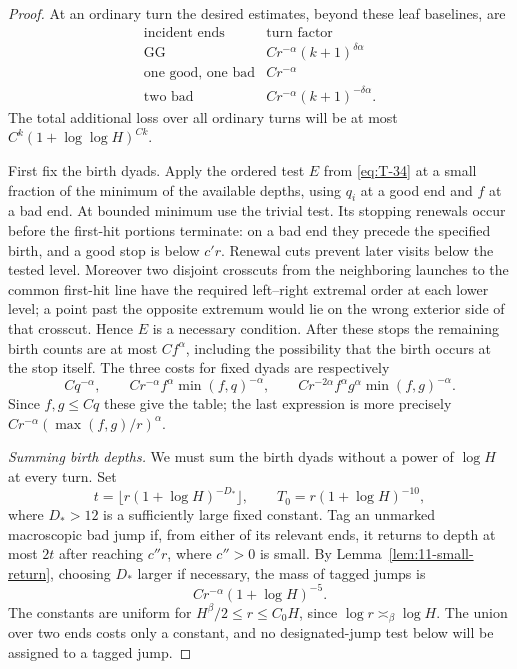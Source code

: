 \begin{proof}
At an ordinary turn the desired estimates, beyond these leaf
baselines, are
\begin{equation}
\begin{array}{c|c}
 \text{incident ends}&\text{turn factor}\\ \hline
 \mathrm{GG}&Cr^{-\alpha}(k+1)^{\delta\alpha}\\
 \text{one good, one bad}&Cr^{-\alpha}\\
 \text{two bad}&Cr^{-\alpha}(k+1)^{-\delta\alpha}.
\end{array}
\label{eq:L-38}
\end{equation}
The total additional loss over all ordinary turns will be at most
$C^k(1+\log\log H)^{Ck}$.

First fix the birth dyads. Apply the ordered test $E$ from
\eqref{eq:T-34} at a small fraction of the minimum of the available
depths, using $q_i$ at a good end and $f$ at a bad end. At bounded
minimum use the trivial test. Its stopping renewals occur before the
first-hit portions terminate: on a bad end they precede the specified
birth, and a good stop is below $c'r$. Renewal cuts prevent later
visits below the tested level. Moreover two disjoint crosscuts from
the neighboring launches to the common first-hit line have the
required left--right extremal order at each lower level; a point past
the opposite extremum would lie on the wrong exterior side of that
crosscut. Hence $E$ is a necessary condition. After these stops the
remaining birth counts are at most $Cf^\alpha$, including the
possibility that the birth occurs at the stop itself. The three costs
for fixed dyads are respectively
\[
 Cq^{-\alpha},\qquad
 Cr^{-\alpha}f^\alpha\min(f,q)^{-\alpha},\qquad
 Cr^{-2\alpha}f^\alpha g^\alpha\min(f,g)^{-\alpha}.
\]
Since $f,g\le Cq$ these give the table; the last expression is more
precisely $Cr^{-\alpha}(\max(f,g)/r)^\alpha$.

\smallskip\noindent\emph{Summing birth depths.}
We must sum the birth dyads without a power of $\log H$ at every turn.
Set
\[
 t=\lfloor r(1+\log H)^{-D_*}\rfloor,\qquad
 T_0=r(1+\log H)^{-10},
\]
where $D_*>12$ is a sufficiently large fixed constant. Tag an unmarked
macroscopic bad jump if, from either of its relevant ends, it returns
to depth at most $2t$ after reaching $c''r$, where $c''>0$ is small.
By Lemma~\ref{lem:11-small-return}, choosing $D_*$ larger if necessary,
the mass of tagged jumps is
\[
 Cr^{-\alpha}(1+\log H)^{-5}.
\]
The constants are uniform for $H^\beta/2\le r\le C_0H$, since
$\log r\asymp_\beta\log H$. The union over two ends costs only a
constant, and no designated-jump test below will be assigned to a
tagged jump.


\end{proof}
